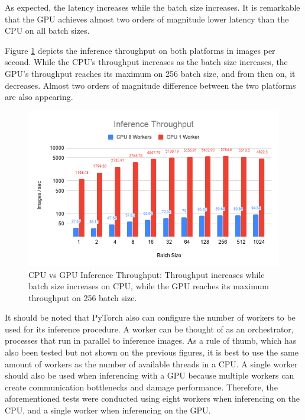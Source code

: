 As expected, the latency increases while the batch size increases. It is remarkable that the GPU achieves almost two orders of magnitude lower latency than the CPU on all batch sizes.

Figure \ref{fig:CPU-vs-GPU-Inference-Throughput} depicts the inference throughput on both platforms in images per second. While the CPU's throughput increases as the batch size increases, the GPU's throughput reaches its maximum on 256 batch size, and from then on, it decreases. Almost two orders of magnitude difference between the two platforms are also appearing.

\begin{figure} [H]
	\centering
	\includegraphics[width=\textwidth]{Images/Results/CPU-GPU-Inference-Throughput.png}
	\decoRule
	\caption[CPU vs GPU Inference Throughput]{CPU vs GPU Inference Throughput: Throughput increases while batch size increases on CPU, while the GPU reaches its maximum throughput on 256 batch size.}
	\label{fig:CPU-vs-GPU-Inference-Throughput}
\end{figure}

It should be noted that PyTorch also can configure the number of workers to be used for its inference procedure. A worker can be thought of as an orchestrator, processes that run in parallel to inference images. As a rule of thumb, which has also been tested but not shown on the previous figures, it is best to use the same amount of workers as the number of available threads in a CPU. A single worker should also be used when inferencing with a GPU because multiple workers can create communication bottlenecks and damage performance. Therefore, the aforementioned tests were conducted using eight workers when inferencing on the CPU, and a single worker when inferencing on the GPU.

